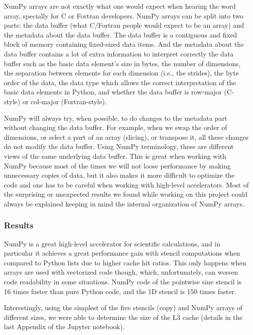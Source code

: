 \documentclass[12pt]{article}
\begin{document}
NumPy arrays are not exactly what one would expect when hearing the word array, specially for C or Fortran developers. NumPy arrays can be split into two parts: the data buffer (what C/Fortran people would expect to be an array) and the metadata about the data buffer. The data buffer is a contiguous and fixed block of memory containing fixed-sized data items. And the metadata about the data buffer contains a lot of extra information to interpret correctly the data buffer such as the basic data element's size in bytes, the number of dimensions, the separation between elements for each dimension (i.e., the strides), the byte order of the data, the data type which allows the correct interpretation of the basic data elements in Python, and whether the data buffer is row-major (C-style) or col-major (Fortran-style).

NumPy will always try, when possible, to do changes to the metadata part without changing the data buffer. For example, when we swap the order of dimensions, or select a part of an array (slicing), or transpose it, all these changes do not modify the data buffer. Using NumPy terminology, these are different views of the same underlying data buffer. This is great when working with NumPy because most of the times we will not loose performance by making unnecessary copies of data, but it also makes it more difficult to optimize the code and one has to be careful when working with high-level accelerators. Most of the surprising or unexpected results we found while working on this project could always be explained keeping in mind the internal organization of NumPy arrays.

\subsubsection{Results}

NumPy is a great high-level accelerator for scientific calculations, and in particular it achieves a great performance gain with stencil computations when compared to Python lists due to higher cache hit ratios. This only happens when arrays are used with vectorized code though, which, unfortunately, can worsen code readability in some situations. NumPy code of the pointwise sine stencil is 16 times faster than pure Python code, and the 1D stencil is 150 times faster.

Interestingly, using the simplest of the five stencils (copy) and NumPy arrays of different sizes, we were able to determine the size of the L3 cache (details in the last Appendix of the Jupyter notebook).
\end{document}
